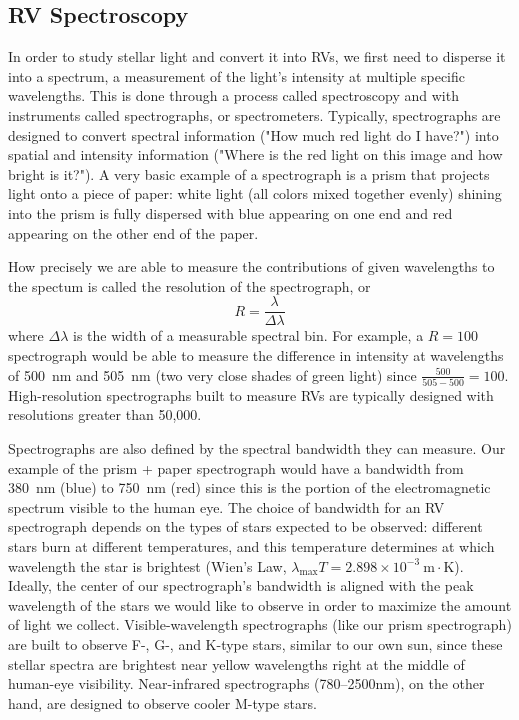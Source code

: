 \subsection{RV Spectroscopy}

In order to study stellar light and convert it into RVs, we first need to disperse it into a spectrum, a measurement of the light's intensity at multiple specific wavelengths. This is done through a process called spectroscopy and with instruments called spectrographs, or spectrometers. Typically, spectrographs are designed to convert spectral information ("How much red light do I have?") into spatial and intensity information ("Where is the red light on this image and how bright is it?"). A very basic example of a spectrograph is a prism that projects light onto a piece of paper: white light (all colors mixed together evenly) shining into the prism is fully dispersed with blue appearing on one end and red appearing on the other end of the paper.

How precisely we are able to measure the contributions of given wavelengths to the spectum is called the resolution of the spectrograph, or
\begin{equation}
    R = \frac{\lambda}{\Delta \lambda}
\end{equation}
where $\Delta \lambda$ is the width of a measurable spectral bin. For example, a $R=100$ spectrograph would be able to measure the difference in intensity at wavelengths of 500~nm and 505~nm (two very close shades of green light) since $\frac{500}{505-500} = 100$. High-resolution spectrographs built to measure RVs are typically designed with resolutions greater than 50,000.

Spectrographs are also defined by the spectral bandwidth they can measure. Our example of the prism + paper spectrograph would have a bandwidth from 380~nm (blue) to 750~nm (red) since this is the portion of the electromagnetic spectrum visible to the human eye. The choice of bandwidth for an RV spectrograph depends on the types of stars expected to be observed: different stars burn at different temperatures, and this temperature determines at which wavelength the star is brightest (Wien's Law, $\lambda_{\mathrm{max}}T = 2.898\times10^{-3}~\mathrm{m\cdot K}$). Ideally, the center of our spectrograph's bandwidth is aligned with the peak wavelength of the stars we would like to observe in order to maximize the amount of light we collect. Visible-wavelength spectrographs (like our prism spectrograph) are built to observe F-, G-, and K-type stars, similar to our own sun, since these stellar spectra are brightest near yellow wavelengths right at the middle of human-eye visibility. Near-infrared spectrographs (780--2500nm), on the other hand, are designed to observe cooler M-type stars.


